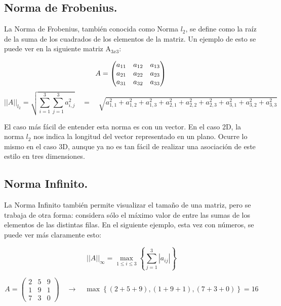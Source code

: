 \documentclass[12pt, notitlepage]{article}
\begin{document}
\subsection{Norma de Frobenius.}
La Norma de Frobenius, también conocida como Norma $l_2$, se define como la raíz de la suma de los cuadrados de los elementos de la matriz. Un ejemplo de esto se puede ver en la siguiente matriz $\text{A}_{3x3}$:

\begin{equation*}
A = 
\begin{pmatrix}
a_{11} & a_{12} & a_{13} \\
a_{21} & a_{22} & a_{23} \\
a_{31} & a_{32} & a_{33}
\end{pmatrix} \\
\end{equation*}
\begin{equation*}
||A||_{l_2} = \sqrt{\sum_{i=1}^3 \sum_{j=1}^3 a_{i,j}^2} \quad = \quad \sqrt{a_{1,1}^2 + a_{1,2}^2 + a_{1,3}^2 + a_{2,1}^2 + a_{2,2}^2 + a_{2,3}^2 + a_{3,1}^2 + a_{3,2}^2 + a_{3,3}^2}
\end{equation*}

El caso más fácil de entender esta norma es con un vector. En el caso 2D, la norma $l_2$ nos indica la longitud del vector representado en un plano. Ocurre lo mismo en el caso 3D, aunque ya no es tan fácil de realizar una asociación de este estilo en tres dimensiones.\\

\subsection{Norma Infinito.}

La Norma Infinito también permite visualizar el tamaño de una matriz, pero se trabaja de otra forma: considera sólo el máximo valor de entre las sumas de los elementos de las distintas filas. En el siguiente ejemplo, esta vez con números, se puede ver más claramente esto:

\begin{equation*}
||A||_\infty = \max\limits_{1\leq i \leq 3} \left\lbrace \sum_{j=1}^3 |a_{ij}| \right\rbrace
\end{equation*}

\begin{equation*}
A = \begin{pmatrix}
2 & 5 & 9 \\
1 & 9 & 1 \\
7 & 3 & 0
\end{pmatrix} \quad \rightarrow \quad \max\left\lbrace (2+5+9),(1+9+1),(7+3+0)\right\rbrace = 16
\end{equation*}
\end{document}
